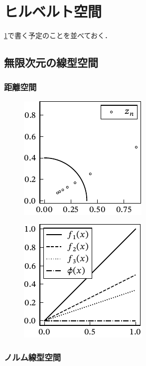 \documentclass[../../main]{subfiles}
\begin{document}
\chapter{ヒルベルト空間}
\label{chapter:hilbert_space}
\begin{lead}
\cref{chapter:hilbert_space}で書く予定のことを並べておく．
\end{lead}

\section{無限次元の線型空間}
\subsection{距離空間}

\begin{figure}[htbp]
  \centering
  \includegraphics{complex_convergence.pdf}
\end{figure}

\begin{figure}[htbp]
  \centering
  \includegraphics{func_convergence.pdf}
\end{figure}

\subsection{ノルム線型空間}
\end{document}

